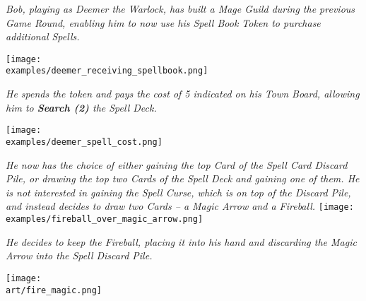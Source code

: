 \begin{multicols*}{2}
\textit{Bob, playing as Deemer the Warlock, has built a Mage Guild during the previous Game Round, enabling him to now use his Spell Book Token to purchase additional Spells.}

\texttt{[image: \\examples/deemer\_receiving\_spellbook.png]}\par
\textit{He spends the token and pays the cost of 5  indicated on his Town Board, allowing him to \textbf{Search (2)} the Spell Deck.}\par
\texttt{[image: \\examples/deemer\_spell\_cost.png]}\par
\filbreak
\textit{He now has the choice of either gaining the top Card of the Spell Card Discard Pile, or drawing the top two Cards of the Spell Deck and gaining one of them.
He is not interested in gaining the Spell Curse, which is on top of the Discard Pile, and instead decides to draw two Cards – a Magic Arrow and a Fireball.}
\texttt{[image: \\examples/fireball\_over\_magic\_arrow.png]}\par
\textit{He decides to keep the Fireball, placing it into his hand and discarding the Magic Arrow into the Spell Discard Pile.}

\vspace*{\fill}

\hfill{\texttt{[image: \\art/fire\_magic.png]}}

\end{multicols*}
